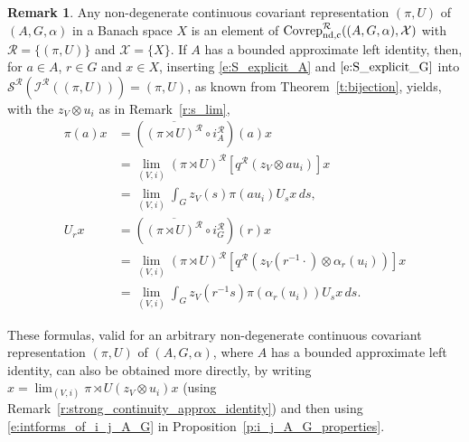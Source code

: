 \documentclass{amsart}
\theoremstyle{plain}
\theoremstyle{definition}
\newtheorem{remark}[theorem]{Remark}
\numberwithin{equation}{section}
\begin{document}
\begin{remark}
Any non-degenerate continuous covariant representation ${(\pi,U)}$ of ${(A,G,\alpha)}$ in a Banach space $X$ is an element of ${\ensuremath{{\textup{Covrep}}_{\textup{nd,c}}^{\mathcal R}}}({(A,G,\alpha)},{\mathcal X})$ with ${\mathcal R}=\{{(\pi,U)}\}$ and ${\mathcal X}=\{X\}$. If $A$ has a bounded approximate left identity, then, for $a \in A$, $r \in G$ and $x \in X$, inserting \eqref{e:S_explicit_A} and $\eqref{e:S_explicit_G}$ into ${{\mathcal S}^{\mathcal R}}({{\mathcal I}^{\mathcal R}}({(\pi,U)}))={(\pi,U)}$, as known from Theorem~\ref{t:bijection}, yields, with the $z_V\otimes u_i$ as in Remark~\ref{r:s_lim},
\begin{align*}
 \pi(a)x &= \left( \overline{(\pi \rtimes U)^\mathcal R} \circ i_A^{\mathcal R} \right)(a) x \\
&= \lim_{(V,i)} {(\pi \rtimes U)^\mathcal R} \left[ {q^{\mathcal R}}(z_V \otimes a u_i) \right] x \\
&= \lim_{(V,i)} \int_G z_V(s) \pi(a u_i) U_s x {\,ds}, \\
U_r x &= \left( \overline{(\pi \rtimes U)^\mathcal R} \circ i_G^{\mathcal R} \right)(r) x \\
&= \lim_{(V,i)} {(\pi \rtimes U)^\mathcal R} \left[ {q^{\mathcal R}}(z_V(r^{-1} \cdot )  \otimes \alpha_r(u_i) ) \right] x \\
&= \lim_{(V,i)} \int_G z_V(r^{-1}s) \pi(\alpha_r(u_i)) U_s x {\,ds}.
\end{align*}

These formulas, valid for an arbitrary non-degenerate continuous covariant representation ${(\pi,U)}$ of ${(A,G,\alpha)}$, where $A$ has a bounded approximate left identity, can also be obtained more directly, by writing $x = \lim_{(V,i)} {\pi \rtimes U}(z_V \otimes u_i) x$ (using Remark~\ref{r:strong_continuity_approx_identity}) and then using \eqref{e:intforms_of_i_j_A_G} in Proposition~\ref{p:i_j_A_G_properties}.
\end{remark}
\end{document}
